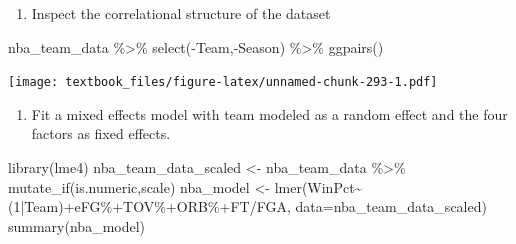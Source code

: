 \documentclass[
  11pt,
]{book}
\newenvironment{Shaded}{\begin{snugshade}}{\end{snugshade}}
\newcommand{\AttributeTok}[1]{\textcolor[rgb]{0.77,0.63,0.00}{#1}}
\newcommand{\DecValTok}[1]{\textcolor[rgb]{0.00,0.00,0.81}{#1}}
\newcommand{\FunctionTok}[1]{\textcolor[rgb]{0.00,0.00,0.00}{#1}}
\newcommand{\NormalTok}[1]{#1}
\newcommand{\OtherTok}[1]{\textcolor[rgb]{0.56,0.35,0.01}{#1}}
\newcommand{\SpecialCharTok}[1]{\textcolor[rgb]{0.00,0.00,0.00}{#1}}
\newcommand{\StringTok}[1]{\textcolor[rgb]{0.31,0.60,0.02}{#1}}
\providecommand{\tightlist}{%
  \setlength{\itemsep}{0pt}\setlength{\parskip}{0pt}}
\theoremstyle{definition}
\theoremstyle{definition}
\theoremstyle{definition}
\theoremstyle{definition}
\theoremstyle{remark}
\begin{document}
\newpage

\begin{enumerate}
\def\labelenumi{(\alph{enumi})}
\setcounter{enumi}{1}
\tightlist
\item
  Inspect the correlational structure of the dataset
\end{enumerate}

\begin{Shaded}
\begin{Highlighting}[]
\NormalTok{nba\_team\_data }\SpecialCharTok{\%\textgreater{}\%} \FunctionTok{select}\NormalTok{(}\SpecialCharTok{{-}}\NormalTok{Team,}\SpecialCharTok{{-}}\NormalTok{Season) }\SpecialCharTok{\%\textgreater{}\%} \FunctionTok{ggpairs}\NormalTok{()}
\end{Highlighting}
\end{Shaded}

\texttt{[image: textbook\_files/figure-latex/unnamed-chunk-293-1.pdf]}

\newpage

\begin{enumerate}
\def\labelenumi{(\alph{enumi})}
\setcounter{enumi}{2}
\tightlist
\item
  Fit a mixed effects model with team modeled as a random effect and the four factors as fixed effects.
\end{enumerate}

\begin{Shaded}
\begin{Highlighting}[]
\FunctionTok{library}\NormalTok{(lme4)}
\NormalTok{nba\_team\_data\_scaled }\OtherTok{\textless{}{-}}\NormalTok{ nba\_team\_data }\SpecialCharTok{\%\textgreater{}\%} \FunctionTok{mutate\_if}\NormalTok{(is.numeric,scale)}
\NormalTok{nba\_model }\OtherTok{\textless{}{-}} \FunctionTok{lmer}\NormalTok{(WinPct}\SpecialCharTok{\textasciitilde{}}\NormalTok{(}\DecValTok{1}\SpecialCharTok{|}\NormalTok{Team)}\SpecialCharTok{+}\StringTok{\textasciigrave{}}\AttributeTok{eFG\%}\StringTok{\textasciigrave{}}\SpecialCharTok{+}\StringTok{\textasciigrave{}}\AttributeTok{TOV\%}\StringTok{\textasciigrave{}}\SpecialCharTok{+}\StringTok{\textasciigrave{}}\AttributeTok{ORB\%}\StringTok{\textasciigrave{}}\SpecialCharTok{+}\StringTok{\textasciigrave{}}\AttributeTok{FT/FGA}\StringTok{\textasciigrave{}}\NormalTok{,}
                  \AttributeTok{data=}\NormalTok{nba\_team\_data\_scaled)}
\FunctionTok{summary}\NormalTok{(nba\_model)}
\end{Highlighting}
\end{Shaded}
\end{document}
